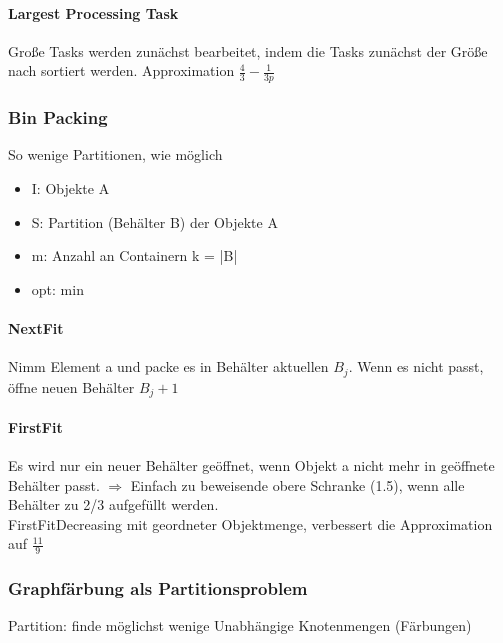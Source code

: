 \documentclass[ngerman]{scrartcl}
\begin{document}
\paragraph{Largest Processing Task} Große Tasks werden zunächst bearbeitet, indem die Tasks zunächst der Größe nach sortiert werden. Approximation $ \frac{4}{3} - \frac{1}{3p} $

\subsubsection{Bin Packing}
So wenige Partitionen, wie möglich
\begin{itemize}
  \item I: Objekte A
  \item S: Partition (Behälter B) der Objekte A
  \item m: Anzahl an Containern k = |B|
  \item opt: min
\end{itemize}

\paragraph{NextFit}
Nimm Element a und packe es in Behälter aktuellen $ B_j $. Wenn es nicht passt, öffne neuen Behälter $ B_j+1 $  

\paragraph{FirstFit}
Es wird nur ein neuer Behälter geöffnet, wenn Objekt a nicht mehr in geöffnete Behälter passt. $ \Rightarrow $ Einfach zu beweisende obere Schranke (1.5), wenn alle Behälter zu 2/3 aufgefüllt werden. 
\\
FirstFitDecreasing mit geordneter Objektmenge, verbessert die Approximation auf $ \frac{11}{9} $

\subsubsection{Graphfärbung als Partitionsproblem}
Partition: finde möglichst wenige Unabhängige Knotenmengen (Färbungen)
\end{document}
